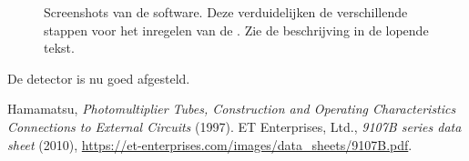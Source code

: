 \begin{figure}
\centering
{}
\hfill
{}
\hfill
{}

\vspace{1em}

\hfill
{}
\hfill
{}

\vspace{1em}

\hfill
{}
\hfill
{}

\caption{Screenshots van de \daq software.  Deze verduidelijken de
verschillende stappen voor het inregelen van de \pmts.  Zie de
beschrijving in de lopende tekst.}
\end{figure}

De detector is nu goed afgesteld.


\begin{thebibliography}{9}
 Hamamatsu, \emph{Photomultiplier Tubes, Construction
and Operating Characteristics Connections to External Circuits} (1997).
 ET Enterprises, Ltd., \emph{9107B series data sheet}
(2010), \url{https://et-enterprises.com/images/data_sheets/9107B.pdf}.
\end{thebibliography}


